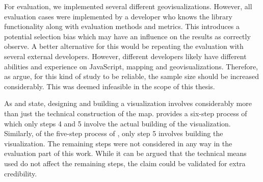 For evaluation, we implemented several different geovisualizations. However, all evaluation cases were implemented by a developer who knows the library functionality along with evaluation methods and metrics. This introduces a potential selection bias which may have an influence on the results as \citet{kitchenham_evaluating_1998} correctly observe. A better alternative for this would be repeating the evaluation with several external developers. However, different developers likely have different abilities and experience on JavaScript, mapping and geovisualizations. Therefore, as \citet{mohagheghi_quality_2007} argue, for this kind of study to be reliable, the sample size should be increased considerably. This was deemed infeasible in the scope of this thesis.

As \citet{schlichtmann_visualization_2002} and \citet{slocum_thematic_2014} state, designing and building a visualization involves considerably more than just the technical construction of the map. \citeauthor{schlichtmann_visualization_2002} provides a six-step process of which only steps 4 and 5 involve the actual building of the visualization. Similarly, of the five-step process of \citeauthor{slocum_thematic_2014}, only step 5 involves building the visualization. The remaining steps were not considered in any way in the evaluation part of this work. While it can be argued that the technical means used do not affect the remaining steps, the claim could be validated for extra credibility.

